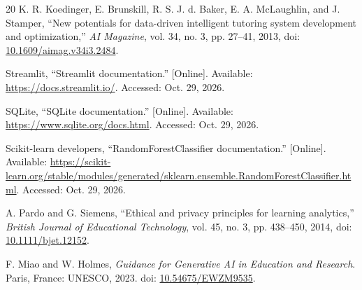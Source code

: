 \documentclass[conference]{IEEEtran}
\begin{document}
\begin{thebibliography}{20}
K. R. Koedinger, E. Brunskill, R. S. J. d. Baker, E. A. McLaughlin, and J. Stamper, ``New potentials for data-driven intelligent tutoring system development and optimization,'' \textit{AI Magazine}, vol. 34, no. 3, pp. 27--41, 2013, doi: \href{https://doi.org/10.1609/aimag.v34i3.2484}{10.1609/aimag.v34i3.2484}.

Streamlit, ``Streamlit documentation.'' [Online]. Available: \url{https://docs.streamlit.io/}. Accessed: Oct. 29, 2026.

SQLite, ``SQLite documentation.'' [Online]. Available: \url{https://www.sqlite.org/docs.html}. Accessed: Oct. 29, 2026.

Scikit-learn developers, ``RandomForestClassifier documentation.'' [Online]. Available: \url{https://scikit-learn.org/stable/modules/generated/sklearn.ensemble.RandomForestClassifier.html}. Accessed: Oct. 29, 2026.

A. Pardo and G. Siemens, ``Ethical and privacy principles for learning analytics,'' \textit{British Journal of Educational Technology}, vol. 45, no. 3, pp. 438--450, 2014, doi: \href{https://doi.org/10.1111/bjet.12152}{10.1111/bjet.12152}.

F. Miao and W. Holmes, \textit{Guidance for Generative AI in Education and Research}. Paris, France: UNESCO, 2023. doi: \href{https://doi.org/10.54675/EWZM9535}{10.54675/EWZM9535}.

\end{thebibliography}
\end{document}
